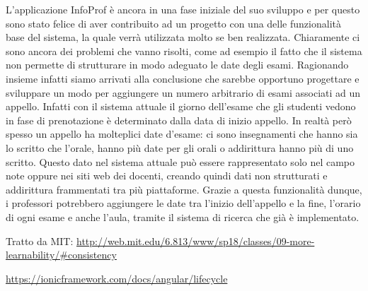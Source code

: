 \documentclass[Lau, oneside, noexaminfo]{sapthesis}%
\begin{document}
L'applicazione InfoProf è ancora in una fase iniziale del suo sviluppo e per questo sono stato felice di aver contribuito ad un progetto con una delle funzionalità base del sistema, la quale verrà utilizzata molto se ben realizzata. Chiaramente ci sono ancora dei problemi che vanno risolti, come ad esempio il fatto che il sistema non permette di strutturare in modo adeguato le date degli esami. Ragionando insieme infatti siamo arrivati alla conclusione che sarebbe opportuno progettare e sviluppare un modo per aggiungere un numero arbitrario di esami associati ad un appello. Infatti con il sistema attuale il giorno dell'esame che gli studenti vedono in fase di prenotazione è determinato dalla data di inizio appello. In realtà però spesso un appello ha molteplici date d'esame: ci sono insegnamenti che hanno sia lo scritto che l'orale, hanno più date per gli orali o addirittura hanno più di uno scritto. Questo dato nel sistema attuale può essere rappresentato solo nel campo note oppure nei siti web dei docenti, creando quindi dati non strutturati e addirittura frammentati tra più piattaforme. Grazie a questa funzionalità dunque, i professori potrebbero aggiungere le date tra l'inizio dell'appello e la fine, l'orario di ogni esame e anche l'aula, tramite il sistema di ricerca che già è implementato.


\backmatter
{}
\begin{thebibliography}{17}

Tratto da MIT:
\url{http://web.mit.edu/6.813/www/sp18/classes/09-more-learnability/#consistency}

\url{https://ionicframework.com/docs/angular/lifecycle}

\end{thebibliography}
\end{document}
